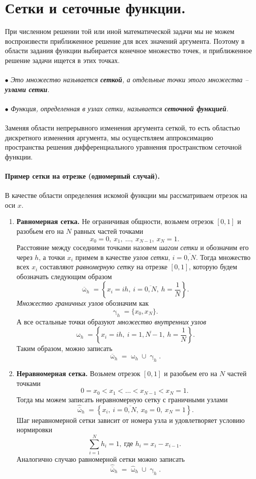 \documentclass[a4paper, 12pt]{report}
\numberwithin{equation}{section}
\renewcommand{\gamma}{\upgamma}
\renewcommand{\omega}{\upomega}
\begin{document}
\section{Сетки и сеточные функции.}
При численном решении той или иной математической задачи мы не можем воспроизвести приближенное решение для всех значений аргумента. Поэтому в области задания функции выбирается конечное множество точек, и приближенное решение задачи ищется в этих точках.
\\\\
$\bullet$ \textit{Это множество называется \textbf{сеткой}, а отдельные точки этого множества -- \textbf{узлами сетки}.}
\\\\
$\bullet$ \textit{Функция, определенная в узлах сетки, называется \textbf{сеточной функцией}.}
\\\\
Заменяя области непрерывного изменения аргумента сеткой, то есть областью дискретного изменения аргумента, мы осуществляем аппроксимацию пространства решения дифференциального уравнения пространством сеточной функции.
\\\\
\textbf{Пример сетки на отрезке (одномерный случай).}\\\\
В качестве области определения искомой функции мы рассматриваем отрезок на оси $x$.
\begin{enumerate}
\item \textbf{Равномерная сетка.}
Не ограничивая общности, возьмем отрезок $[0,1]$ и разобьем его на $N$ равных частей точками $$x_0=0,\ x_1,\ \ldots,\ x_{N-1},\ x_N=1.$$
Расстояние между соседними точками назовем \textit{шагом сетки} и обозначим его через $h$, а точки $x_i$ примем в качестве \textit{узлов сетки}, $i=\overline{0,N}$. Тогда множество всех $x_i$ составляют \textit{равномерную сетку} на отрезке $[0,1]$, которую будем обозначать следующим образом
$$\overline \omega _ h = \left\{x_i = ih,\ i=\overline{0, N},\ h = \dfrac1N\right\}.$$
\textit{Множество граничных узлов} обозначим как $$\gamma_h = \{x_0, x_N\}.$$
А все остальные точки образуют \textit{множество внутренних узлов}
$$ \omega _ h = \left\{x_i = ih,\ i=\overline{1, N-1},\ h = \dfrac1N\right\}.$$
Таким образом, можно записать 
$$\overline \omega _h = \omega _h \cup \gamma _h.$$
\item \textbf{Неравномерная сетка.}
Возьмем отрезок $[0,1]$ и разобьем его на $N$ частей точками $$0=x_0 < x_1 <\ldots< x_{N-1} < x_N=1.$$
Тогда мы можем записать неравномерную сетку с граничными узлами 
$$\hat {\overline \omega} _ h = \left\{x_i,\ i=\overline{0, N},\ x_0 = 0, \ x_N=1\right\}.$$
Шаг неравномерной сетки зависит от номера узла и удовлетворяет условию нормировки $$\sum_{i=1}^{N} h_i=1,\ \text{где } h_i=x_i - x_{i-1}.$$
Аналогично случаю равномерной сетки можно записать $$\hat {\overline \omega} _ h = \hat \omega_h \cup \hat\gamma _h.$$
\end{enumerate}
\end{document}
